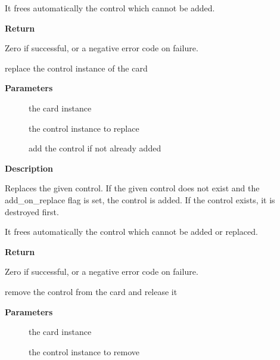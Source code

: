 \documentclass[a4paper,8pt,english]{sphinxmanual}
\begin{document}
It frees automatically the control which cannot be added.

\textbf{Return}

Zero if successful, or a negative error code on failure.

\begin{fulllineitems}
\label{sound/kernel-api/alsa-driver-api:c.snd_ctl_replace}
replace the control instance of the card

\end{fulllineitems}


\textbf{Parameters}
\begin{description}
\item[{}] \leavevmode
the card instance

\item[{}] \leavevmode
the control instance to replace

\item[{}] \leavevmode
add the control if not already added

\end{description}

\textbf{Description}

Replaces the given control.  If the given control does not exist
and the add\_on\_replace flag is set, the control is added.  If the
control exists, it is destroyed first.

It frees automatically the control which cannot be added or replaced.

\textbf{Return}

Zero if successful, or a negative error code on failure.

\begin{fulllineitems}
\label{sound/kernel-api/alsa-driver-api:c.snd_ctl_remove}
remove the control from the card and release it

\end{fulllineitems}


\textbf{Parameters}
\begin{description}
\item[{}] \leavevmode
the card instance

\item[{}] \leavevmode
the control instance to remove

\end{description}
\end{document}
